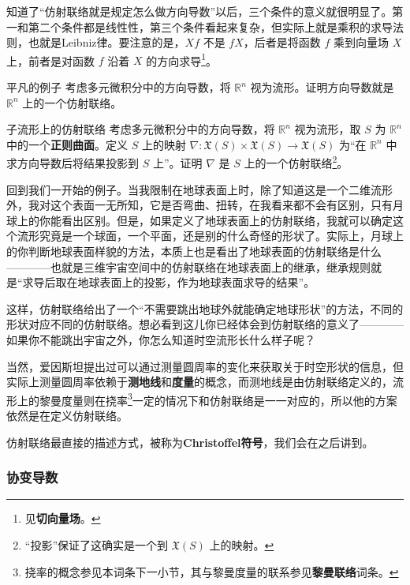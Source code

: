 知道了“仿射联络就是规定怎么做方向导数”以后，三个条件的意义就很明显了。第一和第二个条件都是线性性，第三个条件看起来复杂，但实际上就是乘积的求导法则，也就是Leibniz律。要注意的是，$Xf$ 不是 $fX$，后者是将函数 $f$ 乘到向量场 $X$ 上，前者是对函数 $f$ 沿着 $X$ 的方向求导\footnote{见\textbf{切向量场}。}。


\begin{exercise}{平凡的例子}
考虑多元微积分中的方向导数，将 $\mathbb{R}^n$ 视为流形。证明方向导数就是 $\mathbb{R}^n$ 上的一个仿射联络。
\end{exercise}

\begin{exercise}{子流形上的仿射联络}
考虑多元微积分中的方向导数，将 $\mathbb{R}^n$ 视为流形，取 $S$ 为 $\mathbb{R}^n$ 中的一个\textbf{正则曲面}。定义 $S$ 上的映射 $\nabla:\mathfrak{X}(S)\times\mathfrak{X}(S)\to\mathfrak{X}(S)$ 为“在 $\mathbb{R}^n$ 中求方向导数后将结果投影到 $S$ 上”。证明 $\nabla$ 是 $S$ 上的一个仿射联络\footnote{“投影”保证了这确实是一个到 $\mathfrak{X}(S)$ 上的映射。}。
\end{exercise}

回到我们一开始的例子。当我限制在地球表面上时，除了知道这是一个二维流形外，我对这个表面一无所知，它是否弯曲、扭转，在我看来都不会有区别，只有月球上的你能看出区别。但是，如果定义了地球表面上的仿射联络，我就可以确定这个流形究竟是一个球面，一个平面，还是别的什么奇怪的形状了。实际上，月球上的你判断地球表面样貌的方法，本质上也是看出了地球表面的仿射联络是什么————也就是三维宇宙空间中的仿射联络在地球表面上的继承，继承规则就是“求导后取在地球表面上的投影，作为地球表面求导的结果”。

这样，仿射联络给出了一个“不需要跳出地球外就能确定地球形状”的方法，不同的形状对应不同的仿射联络。想必看到这儿你已经体会到仿射联络的意义了————如果你不能跳出宇宙之外，你怎么知道时空流形长什么样子呢？

当然，爱因斯坦提出过可以通过测量圆周率的变化来获取关于时空形状的信息，但实际上测量圆周率依赖于\textbf{测地线}和\textbf{度量}的概念，而测地线是由仿射联络定义的，流形上的黎曼度量则在挠率\footnote{挠率的概念参见本词条下一小节，其与黎曼度量的联系参见\textbf{黎曼联络}词条。}一定的情况下和仿射联络是一一对应的，所以他的方案依然是在定义仿射联络。

仿射联络最直接的描述方式，被称为\textbf{Christoffel符号}，我们会在之后讲到。

\subsubsection{协变导数}

